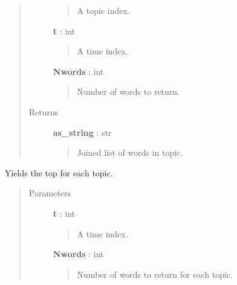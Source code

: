 \documentclass[letterpaper,10pt,english]{sphinxmanual}
\begin{document}
\begin{fulllineitems}
\begin{fulllineitems}
\begin{quote}
\begin{description}
\begin{quote}
A topic index.
\end{quote}

\textbf{t} : int
\begin{quote}

A time index.
\end{quote}

\textbf{Nwords} : int
\begin{quote}

Number of words to return.
\end{quote}

\item[{Returns}] \leavevmode
\textbf{as\_string} : str
\begin{quote}

Joined list of words in topic.
\end{quote}

\end{description}\end{quote}

\end{fulllineitems}


\begin{fulllineitems}
\label{tethne.model.corpus.dtmmodel:tethne.model.corpus.dtmmodel.DTMModel.print_topic_diachronic}
\end{fulllineitems}


\begin{fulllineitems}
\label{tethne.model.corpus.dtmmodel:tethne.model.corpus.dtmmodel.DTMModel.print_topics}
Yields the top  for each topic.
\begin{quote}\begin{description}
\item[{Parameters}] \leavevmode
\textbf{t} : int
\begin{quote}

A time index.
\end{quote}

\textbf{Nwords} : int
\begin{quote}

Number of words to return for each topic.
\end{quote}


\end{description}
\end{quote}
\end{fulllineitems}
\end{fulllineitems}
\end{document}
